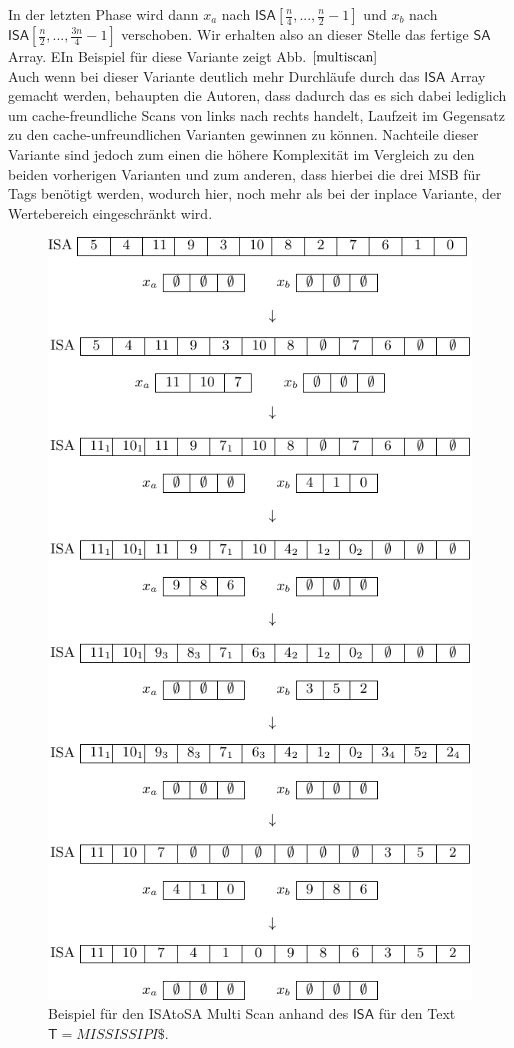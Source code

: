 In der letzten Phase wird dann $x_a$ nach $\mathsf{ISA}[\frac{n}{4},...,\frac{n}{2}-1]$ und $x_b$ nach \\ $\mathsf{ISA}[\frac{n}{2},...,\frac{3n}{4}-1]$ verschoben. Wir erhalten also an dieser Stelle das fertige $\mathsf{SA}$ Array. EIn Beispiel für diese Variante zeigt Abb. $\ref{multiscan}$\\
Auch wenn bei dieser Variante deutlich mehr Durchläufe durch das $\mathsf{ISA}$ Array gemacht werden, behaupten die Autoren, dass dadurch das es sich dabei lediglich um cache-freundliche Scans von links nach rechts handelt, Laufzeit im Gegensatz zu den cache-unfreundlichen Varianten gewinnen zu können. Nachteile dieser Variante sind jedoch zum einen die höhere Komplexität im Vergleich zu den beiden vorherigen Varianten und zum anderen, dass hierbei die drei MSB für Tags benötigt werden, wodurch hier, noch mehr als bei der inplace Variante, der Wertebereich eingeschränkt wird.
\begin{center}
\begin{figure}
\includegraphics[scale=1]{kapitel/komponenten/techniken/bilder/MultiScanExample.pdf}
\caption{Beispiel für den ISAtoSA Multi Scan anhand des $\mathsf{ISA}$ für den Text $\mathsf{T}=MISSISSIPI\$$.}
\label{multiscan}
\end{figure}
\end{center}
